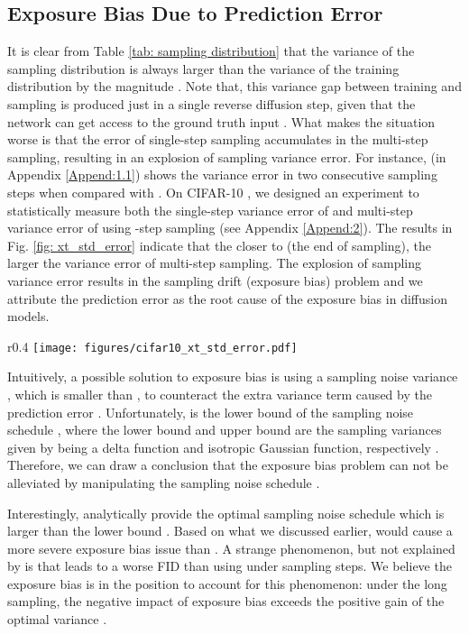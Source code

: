 \documentclass{article} \usepackage{iclr2024_conference,times}
\begin{document}
\subsection{Exposure Bias Due to Prediction Error}
\label{subsec: Exposure Bias Due to Prediction Error}

It is clear from Table \ref{tab: sampling distribution} that the variance of the sampling distribution  is always larger than the variance of the training distribution  by the magnitude . Note that, this variance gap between training and sampling is produced just in a single reverse diffusion step, given that the network  can get access to the ground truth input . What makes the situation worse is that the error of single-step sampling accumulates in the multi-step sampling, resulting in an explosion of sampling variance error. For instance,  (in Appendix \ref{Append:1.1}) shows the variance error in two consecutive sampling steps when compared with . On CIFAR-10 \citep{cifar10}, we designed an experiment to statistically measure both the single-step variance error of  and multi-step variance error of  using -step sampling (see Appendix \ref{Append:2}). The results in Fig. \ref{fig: xt_std_error} indicate that the closer to  (the end of sampling), the larger the variance error of multi-step sampling. The explosion of sampling variance error results in the sampling drift (exposure bias) problem and we attribute the prediction error  as the root cause of the exposure bias in diffusion models.

\begin{wrapfigure}{r}{0.4\textwidth}
\vskip -0.2in
  \texttt{[image: figures/cifar10\_xt\_std\_error.pdf]}
  \captionsetup{skip=2pt}
  \caption{Variance error in single-step and multi-step samplings.}
  \label{fig: xt_std_error}
\vskip -0.3in
\end{wrapfigure}


Intuitively, a possible solution to exposure bias is using a sampling noise variance , which is smaller than , to counteract the extra variance term  caused by the prediction error . Unfortunately,  is the lower bound of the sampling noise schedule , where the lower bound and upper bound are the sampling variances given by  being a delta function and isotropic Gaussian function, respectively \citep{IDDPM}. Therefore, we can draw a conclusion that the exposure bias problem can not be alleviated by manipulating the sampling noise schedule .

Interestingly, \citet{bao2022analytic} analytically provide the optimal sampling noise schedule  which is larger than the lower bound . Based on what we discussed earlier,  would cause a more severe exposure bias issue than . A strange phenomenon, but not explained by \citet{bao2022analytic} is that  leads to a worse FID than using  under  sampling steps. We believe the exposure bias is in the position to account for this phenomenon: under the long sampling, the negative impact of exposure bias exceeds the positive gain of the optimal variance .
\end{document}
